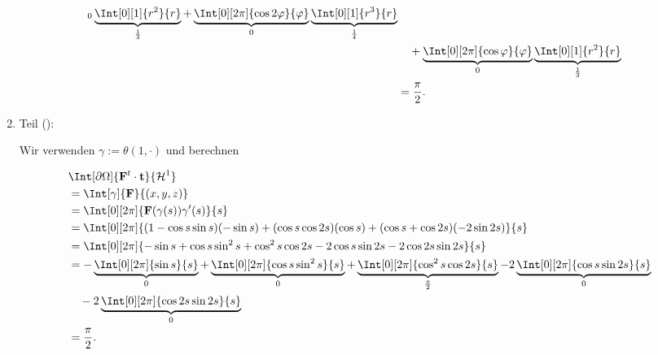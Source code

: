 \begin{solution}
\begin{enumerate}[label = \arabic*.]
\begin{align*}
{        }_0
        \underbrace
        {
            \Int[0][1]
            {
                r^2
            }{r}
        }_\frac{1}{3}
        +
        \underbrace
        {
            \Int[0][2 \pi]
            {
                \cos{2 \varphi}
            }{\varphi}
        }_0
        \underbrace
        {
            \Int[0][1]
            {
                r^3
            }{r}
        }_\frac{1}{4} \\
        & \quad
        +
        \underbrace
        {
            \Int[0][2 \pi]
            {
                \cos \varphi
            }{\varphi}
        }_0
        \underbrace
        {
            \Int[0][1]
            {
                r^2
            }{r}
        }_\frac{1}{3} \\
        & =
        \frac{\pi}{2}.
    \end{align*}
    
    \item Teil ():

    Wir verwenden $\gamma := \theta(1, \cdot)$ und berechnen

    \begin{align*}
        &
        \Int[\partial \Omega]
        {
            \mathbf F^t \cdot \mathbf t
        }{
            \mathcal H^1
        } \\
        & =
        \Int[\gamma]
        {
            \mathbf F
        }{(x, y, z)} \\
        & =
        \Int[0][2 \pi]
        {
            \mathbf F(\gamma(s)) \gamma^\prime(s)
        }{s} \\
        & =
        \Int[0][2 \pi]
        {
            (1 - \cos s \sin s)  (-\sin s)
            +
            (\cos s \cos{2 s})   (\cos s)
            +
            (\cos s + \cos{2 s}) (-2 \sin{2 s})
        }{s} \\
        & =
        \Int[0][2 \pi]
        {
            -\sin s + \cos s \sin^2 s + \cos^2 s \cos{2 s} - 2 \cos s \sin{2 s} - 2 \cos {2 s} \sin{2 s}
        }{s} \\
        & =
        -
        \underbrace
        {
            \Int[0][2 \pi]
            {
                \sin s
            }{s}
        }_0
        +
        \underbrace
        {
            \Int[0][2 \pi]
            {
                \cos s \sin^2 s
            }{s}
        }_0
        +
        \underbrace
        {
            \Int[0][2 \pi]
            {
                \cos^2 s \cos{2 s}
            }{s}
        }_\frac{\pi}{2}
        -
        2
        \underbrace
        {
            \Int[0][2 \pi]
            {
                \cos s \sin{2 s}
            }{s}
        }_0 \\
        & \quad
        -
        2
        \underbrace
        {
            \Int[0][2 \pi]
            {
                \cos{2 s} \sin{2 s}
            }{s}
        }_0 \\
        & =
        \frac{\pi}{2}.
    \end{align*}

\end{enumerate}

\end{solution}


